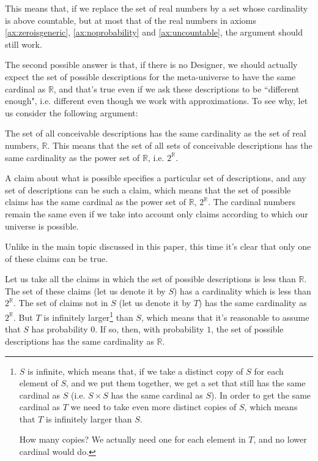 \documentclass[a4paper
,draft
]{article}
\def\reale{\mathbb{R}}
\newcommand{\paper}[1]{paper}
\newcommand{\ghilimele}[1]{``#1"}
\begin{document}
This means that, if we replace the set of real numbers by a set whose
cardinality is above countable, but at most that of the real numbers
in axioms \ref{ax:zeroisgeneric}, \ref{ax:noprobability} and
\ref{ax:uncountable}, the argument should still work.

The second possible answer is that, if there is no Designer, we should actually
expect the set of
possible descriptions for the meta-universe to have the same cardinal as
$\reale$, and that's true even
if we ask these descriptions to be \ghilimele{different enough},
i.e. different even though we work with approximations.
To see why, let us consider the following argument:

The set of all conceivable descriptions has the same cardinality as the
set of real numbers, $\reale$. This means that the
set of all sets of conceivable descriptions
has the same cardinality as the power set of $\reale$, i.e. $2^\reale$.

A claim about what is possible specifies a particular set of descriptions,
and any set of descriptions can be such a claim,
which means that the set of possible claims has the same cardinal as
the power set of $\reale$, $2^\reale$.
The cardinal numbers remain the same even if we take into account only claims
according to which our universe is possible.

Unlike in the main topic discussed in this
\paper{}, this time it's clear that only one of these claims can be true.


Let us take all the claims in which the set of possible descriptions
is less than $\reale$.
The set of these claims (let us denote it by $S$)
has a cardinality which is less than $2^\reale$.
The set of claims not in $S$ (let us denote it by $T$) has the same cardinality
as $2^\reale$. But $T$ is infinitely larger\footnote{
  $S$ is infinite, which means that, if we take a distinct copy of $S$ for each
  element of $S$, and we put them together, we get a set that still has the same
  cardinal as $S$ (i.e. $S\times S$ has the same cardinal as $S$). In order to
  get the same cardinal as $T$ we need to take even more distinct copies of $S$,
  which means that $T$ is infinitely larger than $S$.

  How many copies? We actually need one for each element in $T$, and no lower
  cardinal would do.
} than $S$, which means that it's reasonable to assume that $S$ has probability $0$.
If so, then, with probability $1$, the set of possible descriptions has the same
cardinality as $\reale$.
\end{document}
